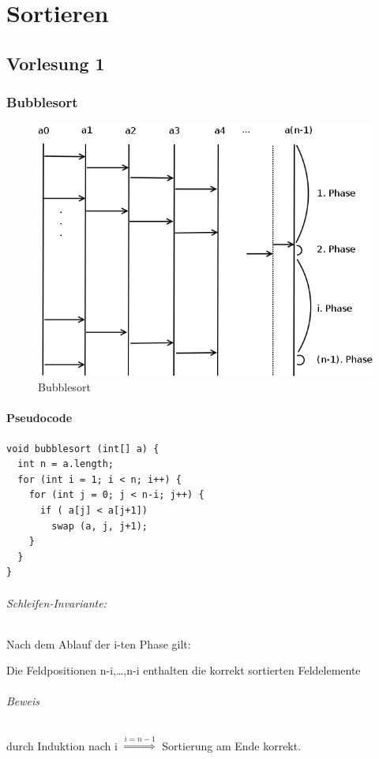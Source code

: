 \part{Sortieren}
\chapter{Vorlesung 1}
\section{Bubblesort}


\begin{figure}[H]
\begin{center}
\includegraphics[width=0.8\linewidth]{1/Grafik/Bubblesort.png}
\caption{Bubblesort}
\end{center}
\end{figure}


\subsection{Pseudocode}
\begin{lstlisting}
void bubblesort (int[] a) {
  int n = a.length;
  for (int i = 1; i < n; i++) {
    for (int j = 0; j < n-i; j++) {
      if ( a[j] < a[j+1])
        swap (a, j, j+1);
    }
  }
}
\end{lstlisting}
\paragraph{Schleifen-Invariante:} Nach dem Ablauf der i-ten Phase gilt:
\begin{center}
	Die Feldpositionen n-i,\ldots,n-i enthalten die korrekt sortierten Feldelemente
\end{center}
\paragraph{Beweis} durch Induktion nach i $\overset{i=n-1}{\Longrightarrow}$ Sortierung am Ende korrekt.


